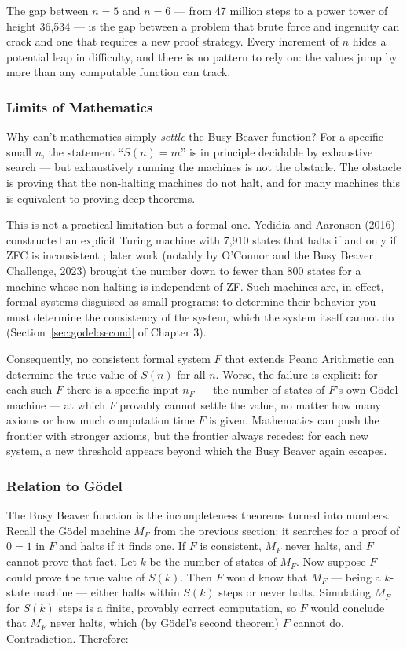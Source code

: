 The gap between $n=5$ and $n=6$ --- from 47 million steps to a power tower of height 36,534 --- is the gap between a problem that brute force and ingenuity can crack and one that requires a new proof strategy. Every increment of $n$ hides a potential leap in difficulty, and there is no pattern to rely on: the values jump by more than any computable function can track.

\subsubsection*{Limits of Mathematics}

Why can't mathematics simply \emph{settle} the Busy Beaver function? For a specific small $n$, the statement ``$S(n) = m$'' is in principle decidable by exhaustive search --- but exhaustively running the machines is not the obstacle. The obstacle is proving that the non-halting machines do not halt, and for many machines this is equivalent to proving deep theorems.

This is not a practical limitation but a formal one. Yedidia and Aaronson (2016) constructed an explicit Turing machine with 7,910 states that halts if and only if ZFC is inconsistent \cite{aaronson2016}; later work (notably by O'Connor and the Busy Beaver Challenge, 2023) brought the number down to fewer than 800 states for a machine whose non-halting is independent of ZF. Such machines are, in effect, formal systems disguised as small programs: to determine their behavior you must determine the consistency of the system, which the system itself cannot do (Section~\ref{sec:godel:second} of Chapter 3).

Consequently, no consistent formal system $F$ that extends Peano Arithmetic can determine the true value of $S(n)$ for all $n$. Worse, the failure is explicit: for each such $F$ there is a specific input $n_F$ --- the number of states of $F$'s own G\"odel machine --- at which $F$ provably cannot settle the value, no matter how many axioms or how much computation time $F$ is given. Mathematics can push the frontier with stronger axioms, but the frontier always recedes: for each new system, a new threshold appears beyond which the Busy Beaver again escapes.

\subsubsection*{Relation to G\"odel}

The Busy Beaver function is the incompleteness theorems turned into numbers. Recall the G\"odel machine $M_F$ from the previous section: it searches for a proof of $0=1$ in $F$ and halts if it finds one. If $F$ is consistent, $M_F$ never halts, and $F$ cannot prove that fact. Let $k$ be the number of states of $M_F$. Now suppose $F$ could prove the true value of $S(k)$. Then $F$ would know that $M_F$ --- being a $k$-state machine --- either halts within $S(k)$ steps or never halts. Simulating $M_F$ for $S(k)$ steps is a finite, provably correct computation, so $F$ would conclude that $M_F$ never halts, which (by G\"odel's second theorem) $F$ cannot do. Contradiction. Therefore:

